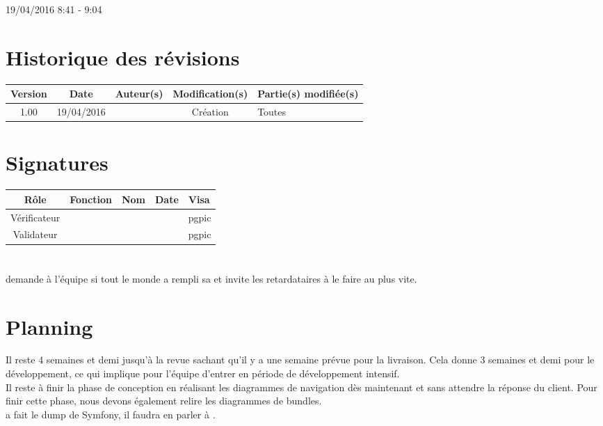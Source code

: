\documentclass [a4paper] {article}
\begin{document}
19/04/2016			 				%
\hfill   
\hfill 	 8:41 - 9:04 				%



\section*{Historique des révisions}
\begin{center}
			\begin{tabular}{| c | c | c | c | p{4cm} |}
				\hline
				\rowcolor{Gray}
				Version & Date & Auteur(s) & Modification(s) & Partie(s) modifiée(s)		 \\
				\hline
				1.00 & 19/04/2016 & \Pierre & Création & Toutes \\
		\hline		
			\end{tabular}
		\end{center}

\section*{Signatures}

		\begin{center}
			\begin{tabular}{| c | c | c | c | p{4cm} |}
				\hline
				\rowcolor{Gray}
				Rôle & Fonction & Nom & Date & Visa		 \\
				\hline
				Vérificateur & \RQA & \Kafui &  & pgpic \\[30pt]
				\hline
				Validateur & \CP & \Sergi &  & pgpic \\[30pt]	
				\hline
			\end{tabular}
		\end{center}



\section{\FS}
\Sergi{} demande à l'équipe si tout le monde a rempli sa \FS{} et invite les retardataires à le faire au plus vite.


\section{Planning}
Il reste 4 semaines et demi jusqu'à la revue sachant qu'il y a une semaine prévue pour la livraison. Cela donne 3 semaines et demi pour le développement, ce qui implique pour l'équipe d'entrer en période de développement intensif. \\
Il reste à finir la phase de conception en réalisant les diagrammes de navigation dès maintenant et sans attendre la réponse du client. Pour finir cette phase, nous devons également relire les diagrammes de bundles. \\
\Kafui{} a fait le dump de Symfony, il faudra en parler à \nomTuteurPedago. \\
\end{document}
